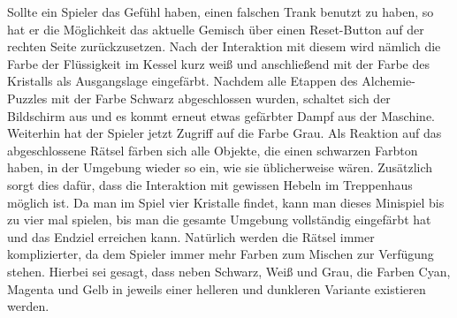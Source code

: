 Sollte ein Spieler das Gefühl haben, einen falschen Trank benutzt zu haben, so hat er die Möglichkeit das aktuelle Gemisch über einen Reset-Button auf der rechten Seite zurückzusetzen. Nach der Interaktion mit diesem wird nämlich die Farbe der Flüssigkeit im Kessel kurz weiß und anschließend mit der Farbe des Kristalls als Ausgangslage eingefärbt. Nachdem alle Etappen des Alchemie-Puzzles mit der Farbe Schwarz abgeschlossen wurden, schaltet sich der Bildschirm aus und es kommt erneut etwas gefärbter Dampf aus der Maschine. Weiterhin hat der Spieler jetzt Zugriff auf die Farbe Grau. Als Reaktion auf das abgeschlossene Rätsel färben sich alle Objekte, die einen schwarzen Farbton haben, in der Umgebung wieder so ein, wie sie üblicherweise wären. Zusätzlich sorgt dies dafür, dass die Interaktion mit gewissen Hebeln im Treppenhaus möglich ist. Da man im Spiel vier Kristalle findet, kann man dieses Minispiel bis zu vier mal spielen, bis man die gesamte Umgebung vollständig eingefärbt hat und das Endziel erreichen kann. Natürlich werden die Rätsel immer komplizierter, da dem Spieler immer mehr Farben zum Mischen zur Verfügung stehen. Hierbei sei gesagt, dass neben Schwarz, Weiß und Grau, die Farben Cyan, Magenta und Gelb in jeweils einer helleren und dunkleren Variante existieren werden. 


